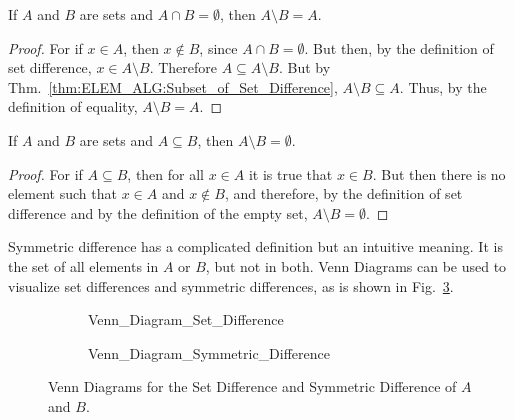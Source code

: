 \documentclass[crop=false,class=book,oneside]{standalone}
\begin{document}
            \begin{theorem}
                If $A$ and $B$ are sets and $A\cap{B}=\emptyset$,
                then $A\setminus{B}=A$.
            \end{theorem}
            \begin{proof}
                For if $x\in{A}$, then $x\notin{B}$,
                since $A\cap{B}=\emptyset$. But then, by the
                definition of set difference,
                $x\in{A}\setminus{B}$. Therefore
                $A\subseteq{A}\setminus{B}$. But by
                Thm.~\ref{thm:ELEM_ALG:Subset_of_Set_Difference},
                $A\setminus{B}\subseteq{A}$. Thus, by the
                definition of equality,
                $A\setminus{B}=A$.
            \end{proof}
            \begin{theorem}
                If $A$ and $B$ are sets and $A\subseteq{B}$,
                then $A\setminus{B}=\emptyset$.
            \end{theorem}
            \begin{proof}
                For if $A\subseteq{B}$, then for all
                $x\in{A}$ it is true that $x\in{B}$. But then
                there is no element such that
                $x\in{A}$ and $x\notin{B}$, and therefore, by
                the definition of set difference and by the
                definition of the empty set,
                $A\setminus{B}=\emptyset$.
            \end{proof}
            Symmetric difference has a complicated definition
            but an intuitive meaning. It is the set of all
            elements in $A$ or $B$, but not in both.
            Venn Diagrams can be used to visualize set
            differences and symmetric differences, as is shown in
            Fig.~\ref{fig:Elem_Alg_Venn_Diagram_Differences}.
            \begin{figure}[H]
                \captionsetup{type=figure}
                \centering
                \begin{subfigure}[b]{0.49\textwidth}
                    \captionsetup{type=figure}
                    \centering
                    {Venn_Diagram_Set_Difference}
                    \label{fig:Elem_Alg_Set_Difference}
                \end{subfigure}
                \begin{subfigure}[b]{0.49\textwidth}
                    \captionsetup{type=figure}
                    \centering
                    
                              {Venn_Diagram_Symmetric_Difference}
                    \label{fig:Elem_Alg_Symmetric_Differece}
                \end{subfigure}
                \caption[Venn Diagrams for Various Set Operations]
                        {Venn Diagrams for the Set Difference
                         and Symmetric Difference of $A$ and $B$.}
                \label{fig:Elem_Alg_Venn_Diagram_Differences}
            \end{figure}
\end{document}
